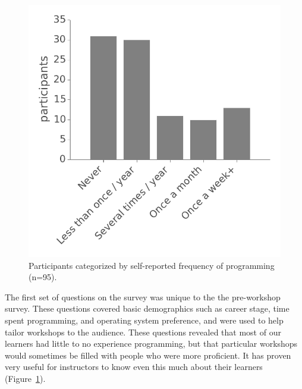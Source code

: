\documentclass[10pt, twocolumn]{article}
\begin{document}
\begin{figure}[!b]
\includegraphics[width=\linewidth]{ProgrammingFrequency}
\caption{Participants categorized by self-reported frequency of programming (n=95).\label{frequency}}

\end{figure}

The first set of questions on the survey was unique to the the pre-workshop survey.
These questions covered basic demographics such as career stage,
time spent programming,
and operating system preference,
and were used to help tailor workshops to the audience.
These questions revealed that most of our learners had little to no experience programming,
but that particular workshops would sometimes be filled with people who were more proficient.
It has proven very useful for instructors to know even this much about their learners (Figure~\ref{frequency}).

\end{document}
